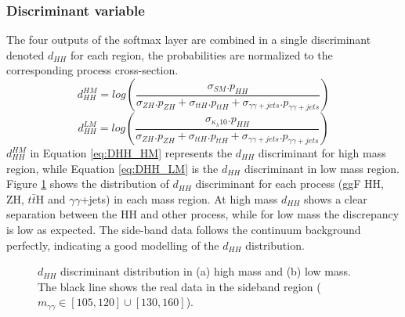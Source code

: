 \subsubsection{Discriminant variable}
The four outputs of the softmax layer are combined in a single discriminant denoted $d_{HH}$ for each region, the probabilities are normalized to the corresponding process cross-section.
\begin{equation}
    d_{HH}^{HM} = log \left(\frac{\sigma_{SM}.p_{HH}}{\sigma_{ZH}.p_{ZH}+\sigma_{ttH}.p_{ttH}+\sigma_{\gamma\gamma+jets}.p_{\gamma\gamma+jets}}\right)
    \label{eq:DHH_HM}
\end{equation}
\begin{equation}
    d_{HH}^{LM} = log \left(\frac{\sigma_{\kappa_\lambda10}.p_{HH}}{\sigma_{ZH}.p_{ZH}+\sigma_{ttH}.p_{ttH}+\sigma_{\gamma\gamma+jets}.p_{\gamma\gamma+jets}}\right)
    \label{eq:DHH_LM}
\end{equation}
$d_{HH}^{HM}$ in Equation \ref{eq:DHH_HM} represents the $d_{HH}$ discriminant for high mass region, while Equation \ref{eq:DHH_LM} is the $d_{HH}$ discriminant in low mass region. \\
Figure \ref{fig:HHyybb:ObjEvt:DNN:dHH} shows the distribution of $d_{HH}$ discriminant for each process (ggF HH, ZH, $t\bar{t}$H and $\gamma\gamma$+jets) in each mass region. At high mass $d_{HH}$ shows a clear separation between the HH and other process, while for low mass the discrepancy is low as expected. The side-band data follows the continuum background perfectly, indicating a good modelling of the $d_{HH}$ distribution. 
\begin{figure}[htbp]
    \centering
    \begin{tcolorbox}[colback=black!5!white,colframe=white!75!black]
    \caption{$d_{HH}$ discriminant distribution in (a) high mass and (b) low mass. The black line shows the real data in the sideband region ($m_{\gamma\gamma}\in[105,120] \cup [130,160]$).}
    \label{fig:HHyybb:ObjEvt:DNN:dHH}
    \end{tcolorbox}
    
\end{figure}

